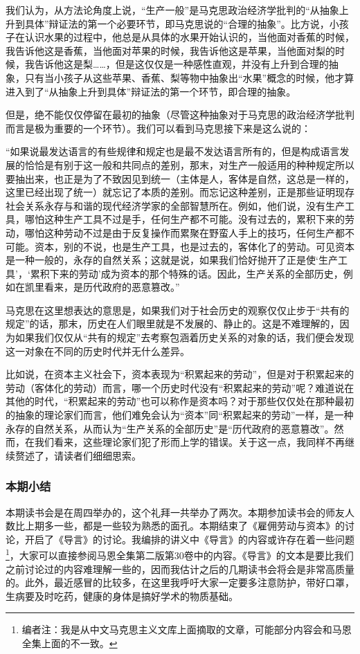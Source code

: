 \documentclass[a4paper,twoside,12pt,AutoFakeBold]{ctexart}
\begin{document}
\vspace{0.8cm}
我们认为，从方法论角度上说，“生产一般”是马克思政治经济学批判的“从抽象上升到具体”辩证法的第一个必要环节，即马克思说的“合理的抽象”。比方说，小孩子在认识水果的过程中，他总是从具体的水果开始认识的，当他面对香蕉的时候，我告诉他这是香蕉，当他面对苹果的时候，我告诉他这是苹果，当他面对梨的时候，我告诉他这是梨……，但是这仅仅是一种感性直观，并没有上升到合理的抽象，只有当小孩子从这些苹果、香蕉、梨等物中抽象出“水果”概念的时候，他才算进入到了“从抽象上升到具体”辩证法的第一个环节，即合理的抽象。

但是，绝不能仅仅停留在最初的抽象（尽管这种抽象对于马克思的政治经济学批判而言是极为重要的一个环节）。我们可以看到马克思接下来是这么说的：
\begin{adjustwidth}{2em}{2em}
    \qquad\fangsong
    “如果说最发达语言的有些规律和规定也是最不发达语言所有的，但是构成语言发展的恰恰是有别于这一般和共同点的差别，那末，对生产一般适用的种种规定所以要抽出来，也正是为了不致因见到统一（主体是人，客体是自然，这总是一样的，这里已经出现了统一）就忘记了本质的差别。而忘记这种差别，正是那些证明现存社会关系永存与和谐的现代经济学家的全部智慧所在。例如，他们说，没有生产工具，哪怕这种生产工具不过是手，任何生产都不可能。没有过去的，累积下来的劳动，哪怕这种劳动不过是由于反复操作而累聚在野蛮人手上的技巧，任何生产都不可能。资本，别的不说，也是生产工具，也是过去的，客体化了的劳动。可见资本是一种一般的，永存的自然关系；这就是说，如果我们恰好抛开了正是使‘生产工具’，‘累积下来的劳动’成为资本的那个特殊的话。因此，生产关系的全部历史，例如在凯里看来，是历代政府的恶意篡改。”
\end{adjustwidth}
马克思在这里想表达的意思是，如果我们对于社会历史的观察仅仅止步于“共有的规定”的话，那末，历史在人们眼里就是不发展的、静止的。这是不难理解的，因为如果我们仅仅从“共有的规定”去考察包涵着历史关系的对象的话，我们便会发现这一对象在不同的历史时代并无什么差异。

比如说，在资本主义社会下，资本表现为“积累起来的劳动”，但是对于积累起来的劳动（客体化的劳动）而言，哪一个历史时代没有“积累起来的劳动”呢？难道说在其他的时代，“积累起来的劳动”也可以称作是资本吗？对于那些仅仅处在那种最初的抽象的理论家们而言，他们难免会认为“资本”同“积累起来的劳动”一样，是一种永存的自然关系，从而认为“生产关系的全部历史”是“历代政府的恶意篡改”。然而，在我们看来，这些理论家们犯了形而上学的错误。关于这一点，我同样不再继续赘述了，请读者们细细思索。

\subsubsection{本期小结}
本期读书会是在周四举办的，这个礼拜一共举办了两次。本期参加读书会的师友人数比上期多一些，都是一些较为熟悉的面孔。本期结束了《雇佣劳动与资本》的讨论，开启了《导言》的讨论。我编排的讲义中《导言》的内容或许存在着一些问题\footnote{编者注：我是从中文马克思主义文库上面摘取的文章，可能部分内容会和马恩全集上面的不一致。}，大家可以直接参阅马恩全集第二版第30卷中的内容。《导言》的文本是要比我们之前讨论过的内容难理解一些的，因而我估计之后的几期读书会将会是非常高质量的。此外，最近感冒的比较多，在这里我呼吁大家一定要多注意防护，带好口罩，生病要及时吃药，健康的身体是搞好学术的物质基础。
\newpage
\end{document}
